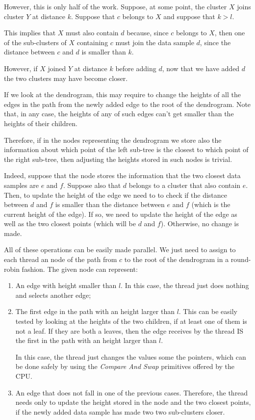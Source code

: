 \documentclass{article}
\begin{document}
However, this is only half of the work. Suppose, at some point, the cluster $X$ joins cluster $Y$
at distance $k$. Suppose that $c$ belongs to $X$ and suppose that $k > l$.

This implies that $X$ must also contain $d$ because, since $c$ belongs to $X$, then one of the
sub-clusters of $X$ containing $c$ must join the data sample $d$, since the distance between $c$
and $d$ is smaller than $k$.

However, if $X$ joined $Y$ at distance $k$ before adding $d$, now that we have added $d$ the two
clusters may have become closer.

If we look at the dendrogram, this may require to change the heights of all the edges in the path
from the newly added edge to the root of the dendrogram.
Note that, in any case, the heights of any of such edges can't get smaller than the heights of
their children.

Therefore, if in the nodes representing the dendrogram we store also the information about which
point of the left sub-tree is the closest to which point of the right sub-tree, then adjusting
the heights stored in such nodes is trivial.

Indeed, suppose that the node stores the information that the two closest data samples are $e$
and $f$. Suppose also that $d$ belongs to a cluster that also contain $e$. Then, to update the
height of the edge we need to to check if the distance between $d$ and $f$ is smaller than the
distance between $e$ and $f$ (which is the current height of the edge). If so, we need to update
the height of the edge as well as the two closest points (which will be $d$ and $f$). Otherwise,
no change is made.

All of these operations can be easily made parallel. We just need to assign to each thread an
node of the path from $c$ to the root of the dendrogram in a round-robin fashion. The given node
can represent:
\begin{enumerate}
    \item An edge with height smaller than $l$. In this case, the thread just does nothing and
    selects another edge;
    
    \item The first edge in the path with an height larger than $l$. This can be easily tested
    by looking at the heights of the two children, if at least one of them is not a leaf. If they
    are both a leaves, then the edge receives by the thread IS the first in the path with an
    height larger than $l$.
    
    In this case, the thread just changes the values some the pointers,
    which can be done safely by using the \textit{Compare And Swap} primitives offered by the CPU.
    
    \item An edge that does not fall in one of the previous cases. Therefore, the thread needs
    only to update the height stored in the node and the two closest points, if the newly added
    data sample has made two two sub-clusters closer.
\end{enumerate}
\end{document}
